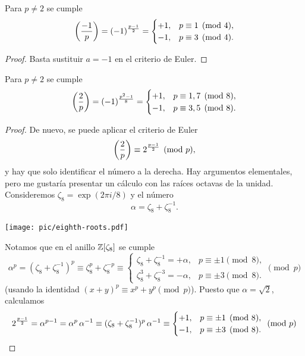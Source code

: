\begin{corolario}
  \label{cor:primera-ley-suplementaria}
  Para $p \ne 2$ se cumple
  \[ \left(\frac{-1}{p}\right) = (-1)^{\frac{p-1}{2}} = \begin{cases}
    +1, & p \equiv 1 \pmod{4},\\
    -1, & p \equiv 3 \pmod{4}.
  \end{cases} \]

  \begin{proof}
    Basta sustituir $a = -1$ en el criterio de Euler.
  \end{proof}
\end{corolario}

\begin{corolario}
  \label{cor:segunda-ley-suplementaria}
  Para $p \ne 2$ se cumple
  \[ \left(\frac{2}{p}\right) = (-1)^{\frac{p^2-1}{8}} = \begin{cases}
    +1, & p \equiv 1,7 \pmod{8},\\
    -1, & p \equiv 3,5 \pmod{8}.
  \end{cases} \]

\begin{proof}
  De nuevo, se puede aplicar el criterio de Euler
  $$\left(\frac{2}{p}\right) \equiv 2^{\frac{p-1}{2}} \pmod{p},$$
  y hay que solo identificar el número a la derecha. Hay argumentos elementales,
  pero me gustaría presentar un cálculo con las raíces octavas de la
  unidad. Consideremos $\zeta_8 = \exp (2\pi i/8)$ y el número
  $$\alpha = \zeta_8 + \zeta_8^{-1}.$$

  \begin{center}
    \texttt{[image: pic/eighth-roots.pdf]}
  \end{center}

  Notamos que en el anillo $\mathbb{Z} [\zeta_8]$ se cumple
  \[ \alpha^p =
     (\zeta_8 + \zeta_8^{-1})^p \equiv
     \zeta_8^p + \zeta_8^{-p} \equiv
     \begin{cases}
       \zeta_8 + \zeta_8^{-1} = +\alpha, & p \equiv \pm 1\pmod{8},\\ \zeta_8^3 +
       \zeta_8^{-3} = -\alpha, & p \equiv \pm 3\pmod{8}.
     \end{cases} \pmod{p} \]
   (usando la identidad $(x+y)^p \equiv x^p + y^p \pmod{p}$).
   Puesto que $\alpha = \sqrt{2}$, calculamos
   \[ 2^{\frac{p-1}{2}} =
      \alpha^{p-1} =
      \alpha^p\,\alpha^{-1} \equiv
      (\zeta_8 + \zeta_8^{-1})^p\,\alpha^{-1} \equiv
      \begin{cases}
        +1, & p \equiv \pm 1\pmod{8},\\
        -1, & p \equiv \pm 3\pmod{8}.
      \end{cases} \pmod{p} \qedhere \]
\end{proof}
\end{corolario}

